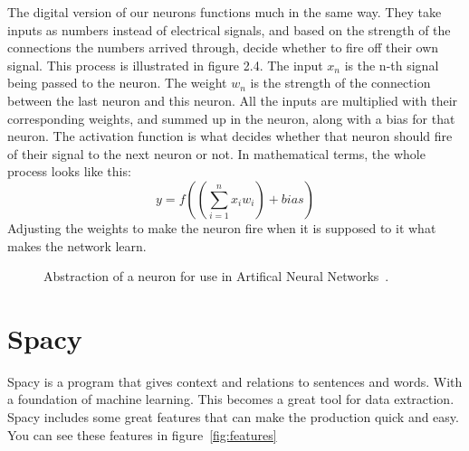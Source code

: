 The digital version of our neurons functions much in the same way.
They take inputs as numbers instead of electrical signals, and based on the strength of the connections the numbers arrived through, decide whether to fire off their own signal.
This process is illustrated in figure 2.4.
The input $x_n$ is the n-th signal being passed to the neuron.
The weight $w_n$ is the strength of the connection between the last neuron and this neuron.
All the inputs are multiplied with their corresponding weights, and summed up in the neuron, along with a bias for that neuron.
The activation function is what decides whether that neuron should fire of their signal to the next neuron or not.
In mathematical terms, the whole process looks like this: \[y = f\left(\left(\sum_{i=1}^{n} x_i w_i\right) + bias\right)\]
Adjusting the weights to make the neuron fire when it is supposed to it what makes the network learn.

\begin{figure}[h]
    \caption{Abstraction of a neuron for use in Artifical Neural Networks~\cite{CreditScoring}. }
    \label{fig:figure2.4}
\end{figure}

\section{Spacy}\label{sec:spacy}

Spacy is a program that gives context and relations to sentences and words.
With a foundation of machine learning.
This becomes a great tool for data extraction.
Spacy includes some great features that can make the production quick and easy.
You can see these features in figure~\ref{fig:features}
\clearpage

